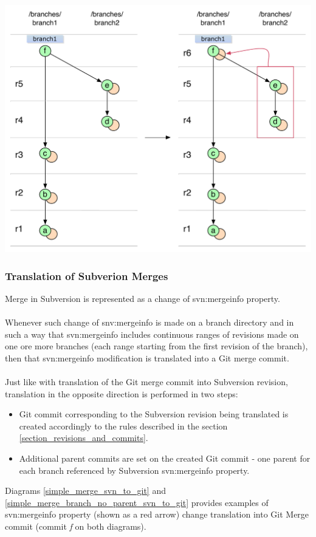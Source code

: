 \begin{center}
\includegraphics[width=\textwidth]{img/diagrams/simple_merge_branch_no_parent_git_to_svn.pdf}%
\label{simple_merge_branch_no_parent_git_to_svn}%
\end{center}

\subsubsection{Translation of Subverion Merges}

Merge in Subversion is represented as a change of svn:mergeinfo property.
\\\\
Whenever such change of snv:mergeinfo is made on a branch directory and in 
such a way that svn:mergeinfo includes continuous ranges of revisions
made on one ore more branches (each range starting from the first revision of the branch), then that svn:mergeinfo modification is translated into a Git merge commit.
\\\\
Just like with translation of the Git merge commit into Subversion revision, 
translation in the opposite direction is performed in two steps:
\begin{itemize}
\item Git commit corresponding to the Subversion revision being translated is created accordingly 
to the rules described in the section \ref{section_revisions_and_commits}.
\item Additional parent commits are set on the created Git commit - one parent for each branch
referenced by Subversion svn:mergeinfo property.
\end{itemize}
Diagrams \ref{simple_merge_svn_to_git} and \ref{simple_merge_branch_no_parent_svn_to_git} provides
examples of svn:mergeinfo property (shown as a red arrow) change translation into Git Merge commit (commit \emph{f} on both
diagrams).

